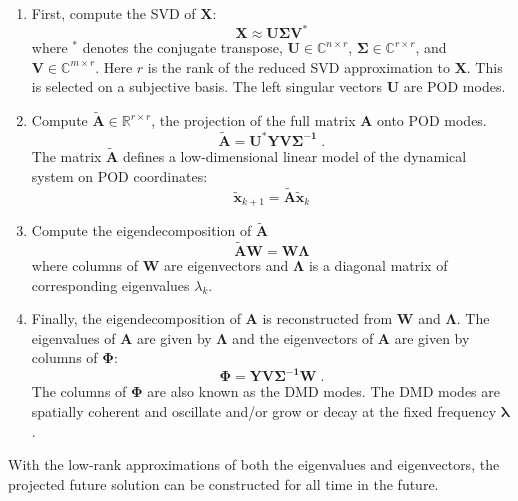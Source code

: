 \begin{enumerate}
    \item First, compute the SVD of $\mathbf{X}$:
    \begin{equation}
        \mathbf{X} \approx \mathbf{U\Sigma V^{\ast}}
    \end{equation}
    where $^\ast$ denotes the conjugate transpose, $\mathbf{U} \in \mathbb{C}^{n \times r}$, $\mathbf{\Sigma} \in \mathbb{C}^{r \times r}$, and $\mathbf{V} \in \mathbb{C}^{m \times r}$. Here $r$ is the rank of the reduced SVD approximation to $\mathbf{X}$. This is selected on a subjective basis. The left singular vectors $\mathbf{U}$ are POD modes.
    \item Compute $\mathbf{\tilde{A}} \in \mathbb{R}^{r \times r}$, the projection of the full matrix $\mathbf{A}$ onto POD modes.
    \begin{equation}
        \mathbf{\tilde{A}} = \mathbf{U^{\ast}YV\Sigma^{-1}} \;.
    \end{equation}
    The matrix $\mathbf{\tilde{A}}$ defines a low-dimensional linear model of the dynamical system on POD coordinates:
    \begin{equation}
        \mathbf{\tilde{x}}_{k+1} = \mathbf{\tilde{A}}\mathbf{\tilde{x}}_k
    \end{equation}
    \item Compute the eigendecomposition of $\mathbf{\tilde{A}}$
    \begin{equation}
        \mathbf{\tilde{A}}\mathbf{W} = \mathbf{W}\mathbf{\Lambda}
    \end{equation}
    where columns of $\mathbf{W}$ are eigenvectors and $\mathbf{\Lambda}$ is a diagonal matrix of corresponding eigenvalues $\lambda_k$.
    \item Finally, the eigendecomposition of $\mathbf{A}$ is reconstructed from $\mathbf{W}$ and $\mathbf{\Lambda}$. The eigenvalues of $\mathbf{A}$ are given by $\mathbf{\Lambda}$ and the eigenvectors of $\mathbf{A}$ are given by columns of $\mathbf{\Phi}$:
    \begin{equation}
    \label{dmdmodes}
        \mathbf{\Phi} = \mathbf{YV\Sigma^{-1}W} \;.
    \end{equation}
The columns of $\mathbf{\Phi}$ are also known as the DMD modes. The DMD modes are spatially coherent and oscillate and/or grow or decay at the fixed frequency $\mathbf{\lambda}$.
\end{enumerate}
With the low-rank approximations of both the eigenvalues and eigenvectors, the projected future solution can be constructed for all time in the future.
